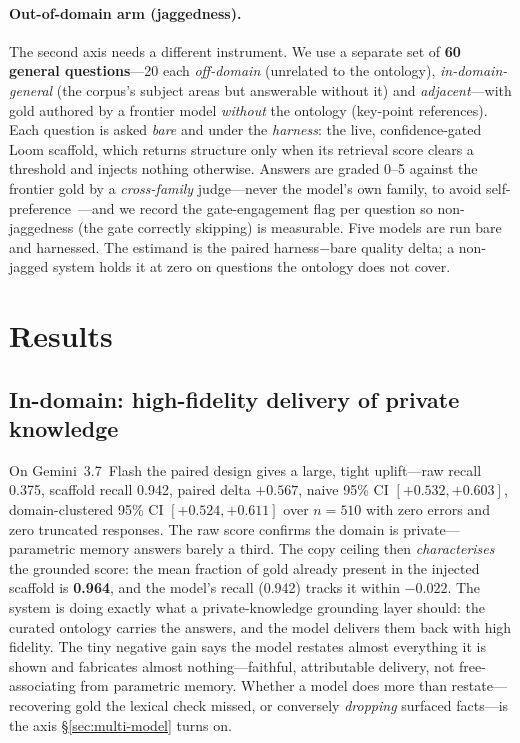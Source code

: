 \documentclass[11pt]{article}
\begin{document}
\paragraph{Out-of-domain arm (jaggedness).}
The second axis needs a different instrument. We use a separate set of \textbf{60 general
questions}---20 each \emph{off-domain} (unrelated to the ontology), \emph{in-domain-general} (the
corpus's subject areas but answerable without it) and \emph{adjacent}---with gold authored by a
frontier model \emph{without} the ontology (key-point references). Each question is asked
\emph{bare} and under the \emph{harness}: the live, confidence-gated Loom scaffold, which returns
structure only when its retrieval score clears a threshold and injects nothing otherwise. Answers
are graded 0--5 against the frontier gold by a \emph{cross-family} judge---never the model's own
family, to avoid self-preference~\cite{panickssery2024selfpreference,zheng2023judging}---and we
record the gate-engagement flag per question so non-jaggedness (the gate correctly skipping) is
measurable. Five models are run bare and harnessed. The estimand is the paired harness$-$bare
quality delta; a non-jagged system holds it at zero on questions the ontology does not cover.

\section{Results}\label{sec:results}

\subsection{In-domain: high-fidelity delivery of private knowledge}
On Gemini~3.7~Flash the paired design gives a large, tight uplift---raw recall 0.375,
scaffold recall 0.942, paired delta $\mathbf{+0.567}$, naive 95\% CI $[+0.532,+0.603]$,
domain-clustered 95\% CI $[+0.524,+0.611]$ over $n=510$ with zero errors and zero truncated
responses. The raw score confirms the domain is private---parametric memory answers barely a
third. The copy ceiling then \emph{characterises} the grounded score: the mean fraction of gold
already present in the injected scaffold is \textbf{0.964}, and the model's recall (0.942) tracks
it within $-0.022$. The system is doing exactly what a private-knowledge grounding layer should:
the curated ontology carries the answers, and the model delivers them back with high fidelity. The
tiny negative gain says the model restates almost everything it is shown and fabricates almost
nothing---faithful, attributable delivery, not free-associating from parametric memory. Whether a
model does more than restate---recovering gold the lexical check missed, or conversely
\emph{dropping} surfaced facts---is the axis \S\ref{sec:multi-model} turns on.
\end{document}
